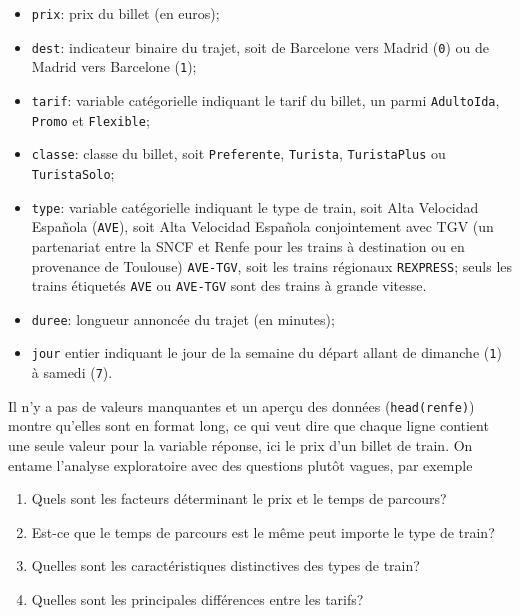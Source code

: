 \documentclass[
  11pt,
  letterpaper,
]{book}
\providecommand{\tightlist}{%
  \setlength{\itemsep}{0pt}\setlength{\parskip}{0pt}}\usepackage{longtable,booktabs,array}
\theoremstyle{definition}
\theoremstyle{remark}
\begin{document}
\begin{itemize}
\tightlist
\item
  \texttt{prix}: prix du billet (en euros);
\item
  \texttt{dest}: indicateur binaire du trajet, soit de Barcelone vers
  Madrid (\texttt{0}) ou de Madrid vers Barcelone (\texttt{1});
\item
  \texttt{tarif}: variable catégorielle indiquant le tarif du billet, un
  parmi \texttt{AdultoIda}, \texttt{Promo} et \texttt{Flexible};
\item
  \texttt{classe}: classe du billet, soit \texttt{Preferente},
  \texttt{Turista}, \texttt{TuristaPlus} ou \texttt{TuristaSolo};
\item
  \texttt{type}: variable catégorielle indiquant le type de train, soit
  Alta Velocidad Española (\texttt{AVE}), soit Alta Velocidad Española
  conjointement avec TGV (un partenariat entre la SNCF et Renfe pour les
  trains à destination ou en provenance de Toulouse) \texttt{AVE-TGV},
  soit les trains régionaux \texttt{REXPRESS}; seuls les trains
  étiquetés \texttt{AVE} ou \texttt{AVE-TGV} sont des trains à grande
  vitesse.
\item
  \texttt{duree}: longueur annoncée du trajet (en minutes);
\item
  \texttt{jour} entier indiquant le jour de la semaine du départ allant
  de dimanche (\texttt{1}) à samedi (\texttt{7}).
\end{itemize}

Il n'y a pas de valeurs manquantes et un aperçu des données
(\texttt{head(renfe)}) montre qu'elles sont en format long, ce qui veut
dire que chaque ligne contient une seule valeur pour la variable
réponse, ici le prix d'un billet de train. On entame l'analyse
exploratoire avec des questions plutôt vagues, par exemple

\begin{enumerate}
\def\labelenumi{\arabic{enumi}.}
\tightlist
\item
  Quels sont les facteurs déterminant le prix et le temps de parcours?
\item
  Est-ce que le temps de parcours est le même peut importe le type de
  train?
\item
  Quelles sont les caractéristiques distinctives des types de train?
\item
  Quelles sont les principales différences entre les tarifs?
\end{enumerate}
\end{document}
